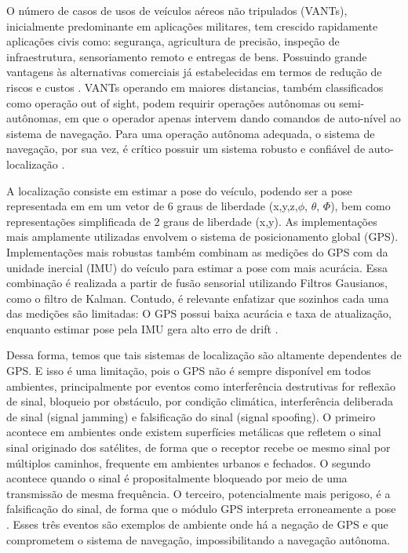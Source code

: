 O número de casos de usos de veículos aéreos não tripulados (VANTs), inicialmente predominante em aplicações militares, tem crescido rapidamente aplicações civis como: segurança, agricultura de precisão, inspeção de infraestrutura, sensoriamento remoto e entregas de bens. Possuindo grande vantagens às alternativas comerciais já estabelecidas em termos de redução de riscos e custos \cite{8682048}. VANTs operando em maiores distancias, também classificados como operação out of sight, podem requirir operações autônomas ou semi-autônomas, em que o operador apenas intervem dando comandos de auto-nível ao sistema de navegação. Para uma operação autônoma adequada, o sistema de navegação, por sua vez, é crítico possuir um sistema robusto e confiável de auto-localização \cite{COUTURIER2021103666}.

A localização consiste em estimar a pose do veículo, podendo ser a pose representada em em um vetor de 6 graus de liberdade (x,y,z,$\phi$, $\theta$, $\Phi$), bem como representações simplificada de 2 graus de liberdade (x,y).
As implementações mais amplamente utilizadas envolvem o sistema de posicionamento global (GPS). Implementações mais robustas também combinam as medições do GPS com da unidade inercial (IMU) do veículo para estimar a pose com mais acurácia. Essa combinação é realizada a partir de fusão sensorial utilizando Filtros Gausianos, como o filtro de Kalman. Contudo, é relevante enfatizar que sozinhos cada uma das medições são limitadas: O GPS possui baixa acurácia e taxa de atualização, enquanto estimar pose pela IMU gera alto erro de drift \cite{COUTURIER2021103666}.

Dessa forma, temos que tais sistemas de localização são altamente dependentes de GPS. E isso é uma limitação, pois o GPS não é sempre disponível em todos ambientes, principalmente por eventos como interferência destrutivas for reflexão de sinal, bloqueio por obstáculo, por condição climática, interferência deliberada de sinal (signal jamming) e falsificação do sinal (signal spoofing).
O primeiro acontece em ambientes onde existem superfícies metálicas que refletem o sinal sinal originado dos satélites, de forma que o receptor recebe oe mesmo sinal por múltiplos caminhos, frequente em ambientes urbanos e fechados. O segundo acontece quando o sinal é propositalmente bloqueado por meio de uma transmissão de mesma frequência. O terceiro, potencialmente mais perigoso, é a falsificação do sinal, de forma que o módulo GPS interpreta erroneamente a pose \cite{YAACOUB2020100218}. Esses três eventos são exemplos de ambiente onde há a negação de GPS e que comprometem o sistema de navegação, impossibilitando a navegação autônoma.


